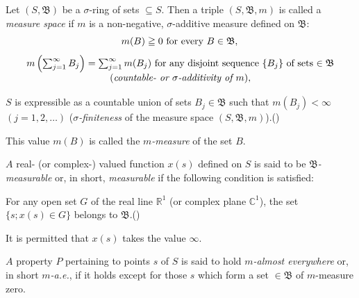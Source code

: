 Let $(S, \mathfrak{B})$ be a $\sigma$-ring of sets $\subseteq S$. Then a triple $(S, \mathfrak{B}, m)$ is called a \emph{measure space} if $m$ is a non-negative, $\sigma$-additive measure defined on $\mathfrak{B}$: 
\begin{equation}
 m(B) \geqq 0 \text{ for every } B \in \mathfrak{B}, \label{eq:0.3.4} \\
\end{equation}
\begin{equation}\label{eq:0.3.5}
\parbox[b]{0.92\linewidth}{\centering
$m\left(\sum\limits_{j=1}^{\infty}B_j\right)=\sum\limits_{j=1}^{\infty}m(B_j)$ for any disjoint sequence $\{B_j\}$ of sets $\in\mathfrak{B}$\par
(\emph{countable- or $\sigma$-additivity of $m$}),}
\end{equation}
\par\medskip{}\label{eq:0.3.6}
\noindent
\parbox[b]{\linewidth}{\setlength{\parindent}{1.2em}\setlength{\parfillskip}{0pt}\indent
$S$ is expressible as a countable union of sets $B_j\in\mathfrak{B}$ such that $m(B_j)<\infty$ $(j=1,2,\ldots)$ (\emph{$\sigma$-finiteness} of the measure space $(S,\mathfrak{B},m)$).\hfill(\theequation)}
\par\medskip
This value $m(B)$ is called the \emph{$m$-measure} of the set $B$. 


\begin{definitionu} $A$ real- (or complex-) valued function $x(s)$ defined on $S$ is said to be \emph{$\mathfrak{B}$-measurable} or, in short, \emph{measurable} if the following condition is satisfied: 

\par\medskip{}\label{eq:0.3.7}
\noindent
\parbox[b]{\linewidth}{\setlength{\parindent}{1.2em}\setlength{\parfillskip}{0pt}\indent
For any open set $G$ of the real line $\mathbb{R}^{1}$ (or complex plane $\mathbb{C}^{1}$), the set $\{s; x(s)\in G\}$ belongs to $\mathfrak{B}$.\hfill(\theequation)}
\par\medskip
It is permitted that $x(s)$ takes the value $\infty$.
\end{definitionu}

\begin{definitionu} $A$ property $P$ pertaining to points $s$ of $S$ is said to hold \emph{$m$-almost everywhere} or, in short \emph{$m$-a.e.}, if it holds except for those $s$ which form a set $\in \mathfrak{B}$ of $m$-measure zero. 
\end{definitionu}

